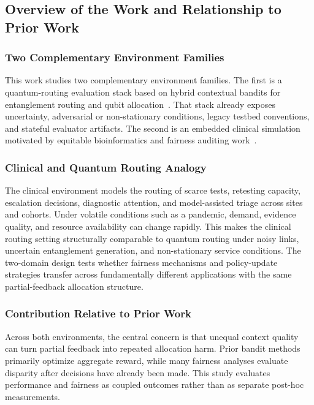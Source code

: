 \subsection{Overview of the Work and Relationship to Prior Work}

\subsubsection{Two Complementary Environment Families}
This work studies two complementary environment families. The first is a
quantum-routing evaluation stack based on hybrid contextual bandits for
entanglement routing and qubit allocation~\cite{garcia2026threat_aware_quantum_routing}.
That stack already exposes uncertainty, adversarial or non-stationary
conditions, legacy testbed conventions, and stateful evaluator artifacts. The
second is an embedded clinical simulation motivated by equitable bioinformatics
and fairness auditing work~\cite{garcia2025equitable_bioinformatics}.

\subsubsection{Clinical and Quantum Routing Analogy}
The clinical environment models the routing of scarce tests, retesting
capacity, escalation decisions, diagnostic attention, and model-assisted triage
across sites and cohorts. Under volatile conditions such as a pandemic, demand,
evidence quality, and resource availability can change rapidly. This makes the
clinical routing setting structurally comparable to quantum routing under noisy
links, uncertain entanglement generation, and non-stationary service
conditions. The two-domain design tests whether fairness mechanisms and
policy-update strategies transfer across fundamentally different applications
with the same partial-feedback allocation structure.

\subsubsection{Contribution Relative to Prior Work}
Across both environments, the central concern is that unequal context quality
can turn partial feedback into repeated allocation harm. Prior bandit methods
primarily optimize aggregate reward, while many fairness analyses evaluate
disparity after decisions have already been made. This study evaluates
performance and fairness as coupled outcomes rather than as separate post-hoc
measurements.

